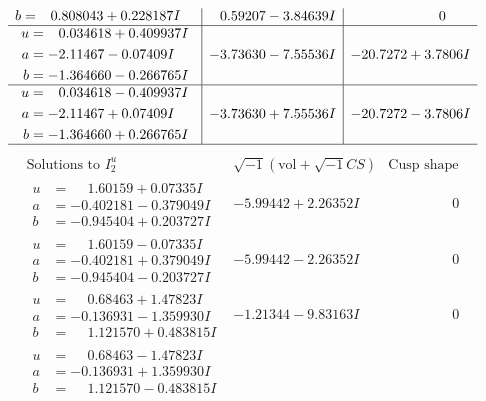 \documentclass[1p]{elsarticle_modified}
\theoremstyle{definition}
\newcommand{\I}{\sqrt{-1}}
\begin{document}
$$\begin{array}{c|c|c}
\begin{aligned}
b &= \phantom{-}0.808043 + 0.228187 I\end{aligned}
 & \phantom{-}0.59207 - 3.84639 I & \phantom{-0.000000 } 0 \\ \hline\begin{aligned}
u &= \phantom{-}0.034618 + 0.409937 I \\
a &= -2.11467 - 0.07409 I \\
b &= -1.364660 - 0.266765 I\end{aligned}
 & -3.73630 - 7.55536 I & -20.7272 + 3.7806 I \\ \hline\begin{aligned}
u &= \phantom{-}0.034618 - 0.409937 I \\
a &= -2.11467 + 0.07409 I \\
b &= -1.364660 + 0.266765 I\end{aligned}
 & -3.73630 + 7.55536 I & -20.7272 - 3.7806 I\\
 \hline 
 \end{array}$$\newpage$$\begin{array}{c|c|c}  
\text{Solutions to }I^u_{2}& \I (\text{vol} + \sqrt{-1}CS) & \text{Cusp shape}\\
 \hline 
\begin{aligned}
u &= \phantom{-}1.60159 + 0.07335 I \\
a &= -0.402181 - 0.379049 I \\
b &= -0.945404 + 0.203727 I\end{aligned}
 & -5.99442 + 2.26352 I & \phantom{-0.000000 } 0 \\ \hline\begin{aligned}
u &= \phantom{-}1.60159 - 0.07335 I \\
a &= -0.402181 + 0.379049 I \\
b &= -0.945404 - 0.203727 I\end{aligned}
 & -5.99442 - 2.26352 I & \phantom{-0.000000 } 0 \\ \hline\begin{aligned}
u &= \phantom{-}0.68463 + 1.47823 I \\
a &= -0.136931 - 1.359930 I \\
b &= \phantom{-}1.121570 + 0.483815 I\end{aligned}
 & -1.21344 - 9.83163 I & \phantom{-0.000000 } 0 \\ \hline\begin{aligned}
u &= \phantom{-}0.68463 - 1.47823 I \\
a &= -0.136931 + 1.359930 I \\
b &= \phantom{-}1.121570 - 0.483815 I\end{aligned}

\end{array}$$
\end{document}
